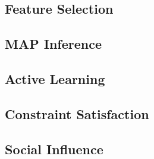 \documentclass[letterpaper, 10 pt, onecolumn]{ieeeconf}
\begin{document}
\subsection{Feature Selection}


\subsection{MAP Inference}


\subsection{Active Learning}


\subsection{Constraint Satisfaction}


\subsection{Social Influence}

\end{document}

